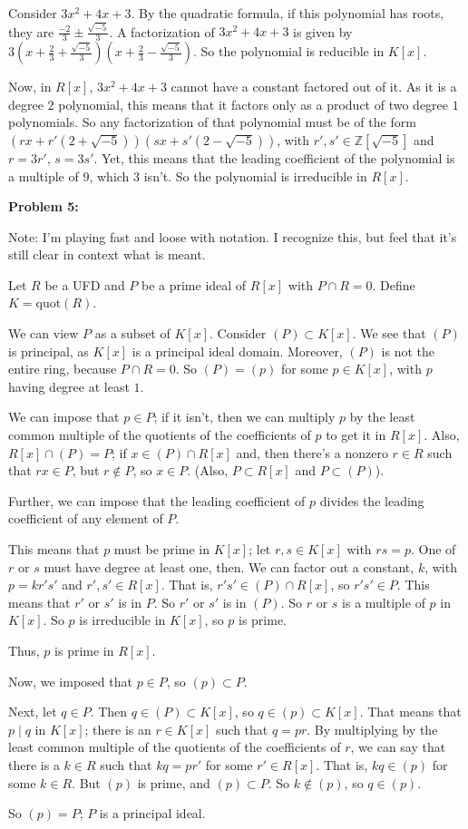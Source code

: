 \documentclass[a4paper,12pt]{article}
\newcommand{\shunt}{\vspace{20mm}}
\newcommand{\Z}{\mathbb{Z}}
\begin{document}
Consider $3x^2 + 4x + 3$. By the quadratic formula, if this polynomial has roots, they are $\frac{-2}{3} \pm \frac{\sqrt{-5}}{3}$. A factorization of $3x^2 + 4x + 3$ is given by $3(x+\frac{2}{3} + \frac{\sqrt{-5}}{3})(x+\frac{2}{3} - \frac{\sqrt{-5}}{3})$. So the polynomial is reducible in $K[x]$.

Now, in $R[x]$, $3x^2 + 4x + 3$ cannot have a constant factored out of it. As it is a degree $2$ polynomial, this means that it factors only as a product of two degree $1$ polynomials. So any factorization of that polynomial must be of the form $(rx+r'(2 +\sqrt{-5}))(sx+s'(2 -\sqrt{-5}))$, with $r',s' \in \Z[\sqrt{-5}]$ and $r=3r'$, $s=3s'$. Yet, this means that the leading coefficient of the polynomial is a multiple of $9$, which $3$ isn't. So the polynomial is irreducible in $R[x]$.

\shunt

{\bf Problem 5:} 

Note: I'm playing fast and loose with notation. I recognize this, but feel that it's still clear in context what is meant.

Let $R$ be a UFD and $P$ be a prime ideal of $R[x]$ with $P \cap R =0$. Define $K = \text{quot}(R)$.

We can view $P$ as a subset of $K[x]$. Consider $(P) \subset K[x]$. We see that $(P)$ is principal, as $K[x]$ is a principal ideal domain. Moreover, $(P)$ is not the entire ring, because $P \cap R = 0$. So $(P) = (p)$ for some $p \in K[x]$, with $p$ having degree at least $1$. %

We can impose that $p \in P$; if it isn't, then we can multiply $p$ by the least common multiple of the quotients of the coefficients of $p$ to get it in $R[x]$. Also, $R[x] \cap (P) = P$; if $x \in (P) \cap R[x]$ and, then there's a nonzero $r \in R$ such that $rx \in P$, but $r \notin P$, so $x \in P$. (Also, $P \subset R[x]$ and $P \subset (P)$).

Further, we can impose that the leading coefficient of $p$ divides the leading coefficient of any element of $P$.

This means that $p$ must be prime in $K[x]$; let $r,s \in K[x]$ with $rs = p$. One of $r$ or $s$ must have degree at least one, then. We can factor out a constant, $k$, with $p=kr's'$ and $r',s' \in R[x]$. That is, $r's' \in (P) \cap R[x]$, so $r's' \in P$. This means that $r'$ or $s'$ is in $P$. So $r'$ or $s'$ is in $(P)$. So $r$ or $s$ is a multiple of $p$ in $K[x]$. So $p$ is irreducible in $K[x]$, so $p$ is prime.

Thus, $p$ is prime in $R[x]$.

Now, we imposed that $p \in P$, so $(p) \subset P$.

Next, let $q \in P$. Then $q \in (P) \subset K[x]$, so $q \in (p) \subset K[x]$. That means that $p \mid q$ in $K[x]$; there is an $r \in K[x]$ such that $q=pr$. By multiplying by the least common multiple of the quotients of the coefficients of $r$, we can say that there is a $k \in R$ such that $kq=pr'$ for some $r' \in R[x]$. That is, $kq \in (p)$ for some $k \in R$. But $(p)$ is prime, and $(p) \subset P$. So $k \notin (p)$, so $q \in (p)$.

So $(p) = P$; $P$ is a principal ideal. 

\shunt
\end{document}
